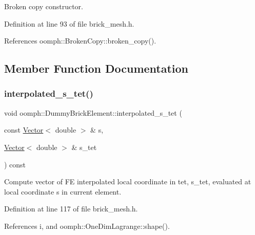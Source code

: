 Broken copy constructor. 



Definition at line 93 of file brick\+\_\+mesh.\+h.



References oomph\+::\+Broken\+Copy\+::broken\+\_\+copy().



\subsection{Member Function Documentation}
\mbox{\label{classoomph_1_1DummyBrickElement_ae0b87160f90b9c04ccb12e93bd266cff}} 
\subsubsection{\texorpdfstring{interpolated\+\_\+s\+\_\+tet()}{interpolated\_s\_tet()}}
{\footnotesize\ttfamily void oomph\+::\+Dummy\+Brick\+Element\+::interpolated\+\_\+s\+\_\+tet (\begin{DoxyParamCaption}\item[{const \hyperlink{classoomph_1_1Vector}{Vector}$<$ double $>$ \&}]{s,  }\item[{\hyperlink{classoomph_1_1Vector}{Vector}$<$ double $>$ \&}]{s\+\_\+tet }\end{DoxyParamCaption}) const\hspace{0.3cm}{\ttfamily [inline]}}



Compute vector of FE interpolated local coordinate in tet, s\+\_\+tet, evaluated at local coordinate s in current element. 



Definition at line 117 of file brick\+\_\+mesh.\+h.



References i, and oomph\+::\+One\+Dim\+Lagrange\+::shape().

\mbox{\label{classoomph_1_1DummyBrickElement_aed7e6c49983412089fd46628bc07279a}} 
